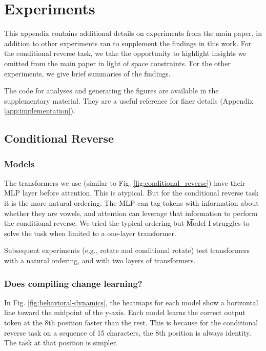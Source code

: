 \section{Experiments}
\label{app:experiments}

This appendix contains additional details on experiments from the main paper, in addition to
other experiments ran to supplement the findings in this work. For the conditional reverse task,
we take the opportunity to highlight insights we omitted from the main paper in light of space constraints.
For the other experiments, we give brief summaries of the findings.

The code for analyses and generating the figures are available in the supplementary material. They are
a useful reference for finer details (Appendix \ref{app:implementation}).

\subsection{Conditional Reverse}
\label{app:experiments-cond-rev}

\subsubsection{Models}

The transformers we use (similar to Fig. \ref{fig:conditional_reverse}) have their MLP layer before attention. This is atypical. But for the conditional reverse
task it is the more natural ordering. The MLP can tag tokens with information about whether they are vowels,
and attention can leverage that information to perform the conditional reverse. We tried the typical ordering
but \t{Model I} struggles to solve the task when limited to a one-layer transformer.

Subsequent experiments (e.g., rotate and conditional rotate) test transformers with a natural ordering,
and with two layers of transformers.

\subsubsection{Does compiling change learning?}

In Fig. \ref{fig:behavioral-dynamics}, the heatmaps for each model show a horizontal line toward the midpoint of the y-axis.
Each model learns the correct output token at the 8th position faster than the rest. This is because for the conditional
reverse task on a sequence of 15 characters, the 8th position is always identity. The task at that position is simpler.

